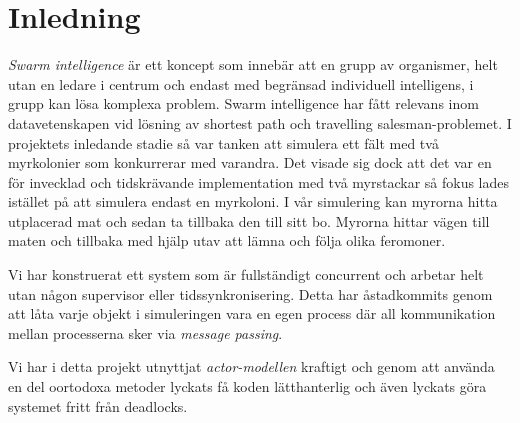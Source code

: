 \chapter{Inledning} 

\label{Inledning} 


\emph{Swarm intelligence} är ett koncept som innebär att en grupp av organismer, helt utan en ledare i centrum och endast med begränsad individuell intelligens, i grupp kan lösa komplexa problem. Swarm intelligence har fått relevans inom datavetenskapen vid lösning av shortest path och travelling salesman-problemet\citep{Reference4}. I projektets inledande stadie så var tanken att simulera ett fält med två myrkolonier som konkurrerar med varandra. Det visade sig dock att det var en för invecklad och tidskrävande implementation med två myrstackar så fokus lades istället på att simulera endast en myrkoloni. I vår simulering kan myrorna hitta utplacerad mat och sedan ta tillbaka den till sitt bo. Myrorna hittar vägen till maten och tillbaka med hjälp utav att lämna och följa olika feromoner.

Vi har konstruerat ett system som är fullständigt concurrent och arbetar helt utan någon supervisor eller tidssynkronisering. Detta har åstadkommits genom att låta varje objekt i simuleringen vara en egen process där all kommunikation mellan processerna sker via \emph{message passing}.

Vi har i detta projekt utnyttjat \emph{actor-modellen} kraftigt och genom att använda en del oortodoxa metoder lyckats få koden lätthanterlig och även lyckats göra systemet fritt från deadlocks.


